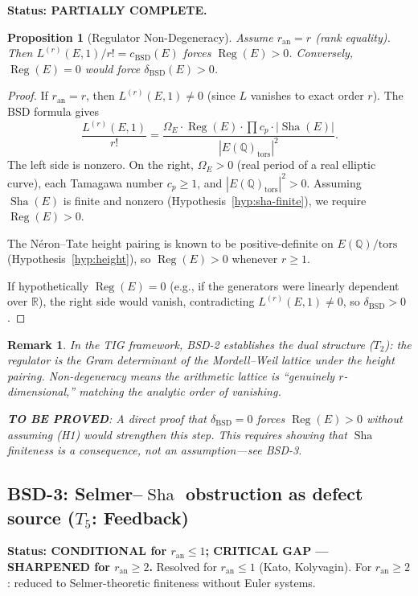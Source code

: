 \documentclass[11pt]{article}
\newtheorem{proposition}[theorem]{Proposition}
\newtheorem{remark}[theorem]{Remark}
\DeclareMathOperator{\Reg}{Reg}
\DeclareMathOperator{\Sha}{Sha}
\begin{document}
\textbf{Status: PARTIALLY COMPLETE.}

\begin{proposition}[Regulator Non-Degeneracy]
\label{prop:bsd2}
Assume $r_{\mathrm{an}} = r$ (rank equality).  Then $L^{(r)}(E,1)/r! =
c_{\mathrm{BSD}}(E)$ forces $\Reg(E) > 0$.  Conversely, $\Reg(E) = 0$ would
force $\delta_{\mathrm{BSD}}(E) > 0$.
\end{proposition}

\begin{proof}
If $r_{\mathrm{an}} = r$, then $L^{(r)}(E,1) \neq 0$ (since $L$ vanishes to
exact order $r$).  The BSD formula gives
\[
  \frac{L^{(r)}(E,1)}{r!} =
  \frac{\Omega_E \cdot \Reg(E) \cdot \prod c_p \cdot |\Sha(E)|}
       {|E(\mathbb{Q})_{\mathrm{tors}}|^2}.
\]
The left side is nonzero.  On the right, $\Omega_E > 0$ (real period of a real
elliptic curve), each Tamagawa number $c_p \geq 1$, and
$|E(\mathbb{Q})_{\mathrm{tors}}|^2 > 0$.  Assuming $\Sha(E)$ is finite and
nonzero (Hypothesis~\ref{hyp:sha-finite}), we require $\Reg(E) > 0$.

The N\'eron--Tate height pairing is known to be positive-definite on
$E(\mathbb{Q})/\mathrm{tors}$ (Hypothesis~\ref{hyp:height}), so
$\Reg(E) > 0$ whenever $r \geq 1$.

If hypothetically $\Reg(E) = 0$ (e.g., if the generators were linearly
dependent over $\mathbb{R}$), the right side would vanish, contradicting
$L^{(r)}(E,1) \neq 0$, so $\delta_{\mathrm{BSD}} > 0$.
\end{proof}

\begin{remark}
In the TIG framework, BSD-2 establishes the \emph{dual structure} ($T_2$): the
regulator is the Gram determinant of the Mordell--Weil lattice under the height
pairing.  Non-degeneracy means the arithmetic lattice is ``genuinely
$r$-dimensional,'' matching the analytic order of vanishing.

\textbf{TO BE PROVED}: A direct proof that $\delta_{\mathrm{BSD}} = 0$ forces
$\Reg(E) > 0$ without assuming (H1) would strengthen this step.  This requires
showing that $\Sha$ finiteness is a consequence, not an assumption---see BSD-3.
\end{remark}

\subsection{BSD-3: Selmer--$\Sha$ obstruction as defect source ($T_5$: Feedback)}

\textbf{Status: CONDITIONAL for $r_{\mathrm{an}} \leq 1$; CRITICAL GAP --- SHARPENED for
$r_{\mathrm{an}} \geq 2$.}  Resolved for $r_{\mathrm{an}} \leq 1$
(Kato, Kolyvagin).  For $r_{\mathrm{an}} \geq 2$: reduced to Selmer-theoretic
finiteness without Euler systems.
\end{document}
